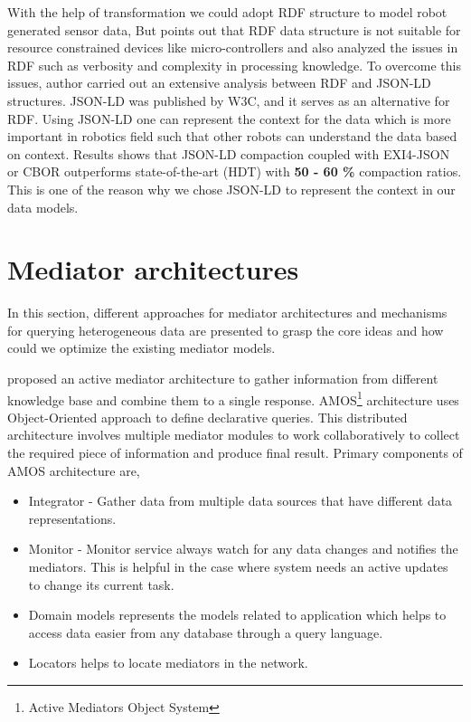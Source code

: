 	With the help of transformation we could adopt RDF structure to model robot generated sensor data, But \citet{charpenay2018towards} points out that RDF data structure is not suitable for resource constrained devices like micro-controllers and also analyzed the issues in RDF such as verbosity and complexity in processing knowledge. To overcome this issues, author carried out an extensive analysis between RDF and JSON-LD structures. JSON-LD was published by W3C, and it serves as an alternative for RDF. Using JSON-LD one can represent the context for the data which is more important in robotics field such that other robots can understand the data based on context. Results shows that JSON-LD compaction coupled with EXI4-JSON or CBOR outperforms state-of-the-art (HDT) with \textbf{50 - 60 \% }compaction ratios. This is one of the reason why we chose JSON-LD to represent the context in our data models.
	
	\section{Mediator architectures}
    In this section, different approaches for mediator architectures and mechanisms for querying heterogeneous data are presented to grasp the core ideas and how could we optimize the existing mediator models.
	
	\citet{fahl1993amos} proposed an active mediator architecture to gather information from different knowledge base and combine them to a single response. AMOS\footnote{\label{amos}Active Mediators Object System} architecture uses Object-Oriented approach to define declarative queries. This distributed architecture involves multiple mediator modules to work collaboratively to collect the required piece of information and produce final result. Primary components of AMOS architecture are,
	\begin{itemize}
		\item Integrator - Gather data from multiple data sources that have different data representations.
		\item Monitor - Monitor service always watch for any data changes and notifies the mediators. This is helpful in the case where system needs an active updates to change its current task.
		\item Domain models represents the models related to application which helps to access data easier from any database through a query language.
		\item Locators helps to locate mediators in the network.
	\end{itemize}
	
